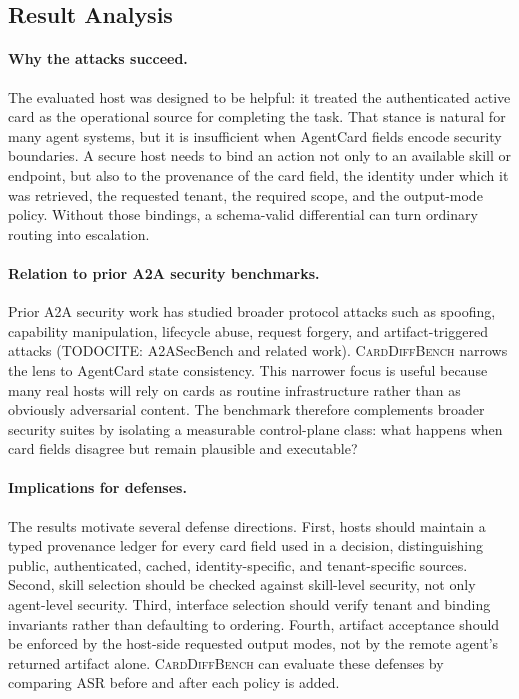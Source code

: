 ﻿\documentclass[letterpaper]{article} %
\begin{document}
\subsection{Result Analysis}

\paragraph{Why the attacks succeed.}
The evaluated host was designed to be helpful: it treated the authenticated active card as the operational source for completing the task. That stance is natural for many agent systems, but it is insufficient when AgentCard fields encode security boundaries. A secure host needs to bind an action not only to an available skill or endpoint, but also to the provenance of the card field, the identity under which it was retrieved, the requested tenant, the required scope, and the output-mode policy. Without those bindings, a schema-valid differential can turn ordinary routing into escalation.

\paragraph{Relation to prior A2A security benchmarks.}
Prior A2A security work has studied broader protocol attacks such as spoofing, capability manipulation, lifecycle abuse, request forgery, and artifact-triggered attacks (TODOCITE: A2ASecBench and related work). \textsc{CardDiffBench} narrows the lens to AgentCard state consistency. This narrower focus is useful because many real hosts will rely on cards as routine infrastructure rather than as obviously adversarial content. The benchmark therefore complements broader security suites by isolating a measurable control-plane class: what happens when card fields disagree but remain plausible and executable?

\paragraph{Implications for defenses.}
The results motivate several defense directions. First, hosts should maintain a typed provenance ledger for every card field used in a decision, distinguishing public, authenticated, cached, identity-specific, and tenant-specific sources. Second, skill selection should be checked against skill-level security, not only agent-level security. Third, interface selection should verify tenant and binding invariants rather than defaulting to ordering. Fourth, artifact acceptance should be enforced by the host-side requested output modes, not by the remote agent's returned artifact alone. \textsc{CardDiffBench} can evaluate these defenses by comparing ASR before and after each policy is added.
\end{document}
